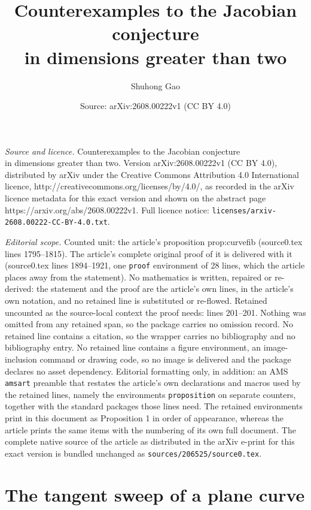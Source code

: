 \documentclass[10pt,a4paper]{amsart}
\title{Counterexamples to the Jacobian conjecture\\ in dimensions greater than two}
\author{Shuhong Gao}
\date{Source: arXiv:2608.00222v1 (CC BY 4.0)}
\begin{document}
\maketitle

\noindent\emph{Source and licence.} Counterexamples to the Jacobian conjecture\\ in dimensions greater than two. Version arXiv:2608.00222v1 (CC BY 4.0), distributed by arXiv under the Creative Commons Attribution 4.0 International licence, http://creativecommons.org/licenses/by/4.0/, as recorded in the arXiv licence metadata for this exact version and shown on the abstract page https://arxiv.org/abs/2608.00222v1. Full licence notice: \texttt{licenses/arxiv-2608.00222-CC-BY-4.0.txt}.\par\smallskip

\noindent\textit{Editorial scope.} Counted unit: the article's proposition prop:curvefib (source0.tex lines 1795--1815). The article's complete original proof of it is delivered with it (source0.tex lines 1894--1921, one \texttt{proof} environment of 28 lines, which the article places away from the statement). No mathematics is written, repaired or re-derived: the statement and the proof are the article's own lines, in the article's own notation, and no retained line is substituted or re-flowed.  Retained uncounted as the source-local context the proof needs: lines 201--201.  Nothing was omitted from any retained span, so the package carries no omission record.  No retained line contains a citation, so the wrapper carries no bibliography and no bibliography entry.  No retained line contains a figure environment, an image-inclusion command or drawing code, so no image is delivered and the package declares no asset dependency.  Editorial formatting only, in addition: an AMS \texttt{amsart} preamble that restates the article's own declarations and macros used by the retained lines, namely the environments \texttt{proposition} on separate counters, together with the standard packages those lines need.  The retained environments print in this document as Proposition 1 in order of appearance, whereas the article prints the same items with the numbering of its own full document.  The complete native source of the article as distributed in the arXiv e-print for this exact version is bundled unchanged as \texttt{sources/206525/source0.tex}.
\section{The tangent sweep of a plane curve}\label{sec:sweep}
\end{document}
